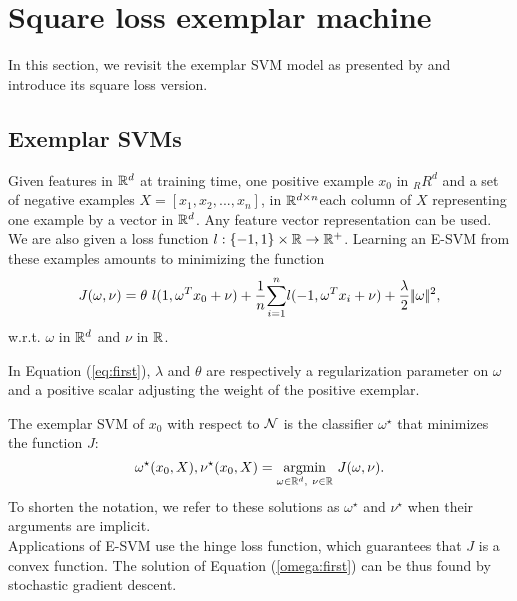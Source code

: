\section{Square loss exemplar machine}\label{lsesvm}
In this section, we revisit the exemplar SVM model as presented by \cite{Efros11} and introduce its square loss version.
\subsection{Exemplar SVMs} \label{esvm}
Given features in $\mathbb R^d$ at training time, one positive example $x_0$ in $_RR^d$ and a set of negative examples $X = [x_1, x_2,...,x_n]$, in $\mathbb R^{d\times n}$each column of $X$ representing one example by a vector in $\mathbb R^d$. 
Any feature vector representation can be used.
We are also given a loss function $l:\{-1, 1\}\times \mathbb R\rightarrow\mathbb R^+$. Learning an E-SVM from these examples amounts to minimizing the function 
\begin{equation}
J(\omega, \nu) = \theta \ l(1, \omega^Tx_0+\nu) +\dfrac{1}{n}\displaystyle{\sum_{i=1}^n} l(-1, \omega^T x_i+\nu)+\dfrac{\lambda}{2}|\!|\omega|\!|^2, \label{eq:first}
\end{equation}
w.r.t. $\omega$ in $\mathbb R^d$ and $\nu$ in $\mathbb R$.

In Equation (\ref{eq:first}), $\lambda$ and $\theta$ are respectively a regularization parameter on $\omega$ and a positive scalar adjusting the weight of the positive exemplar.

The  exemplar SVM of $x_0$ with respect to $\mathcal N$ is the classifier $\omega^\star$ that minimizes the function $J$:
\begin{equation}
\omega^\star(x_0, X), \nu^\star(x_0, X) = \underset{\omega\in\mathbb R^d, \ \nu\in\mathbb R}{\operatorname*{argmin}} \ J(\omega, \nu). \label{omega:first}
\end{equation}
To shorten the notation, we refer to these solutions as $\omega^\star$ and $\nu^\star$ when their arguments are implicit.\\
Applications of E-SVM use the hinge loss function, which guarantees that $J$ is a convex function. The solution of Equation (\ref{omega:first}) can be thus found by stochastic gradient descent.

